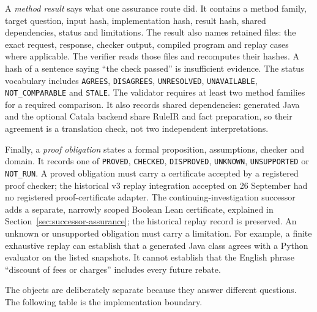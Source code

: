A \emph{method result} says what one assurance route did. It contains a method
family, target question, input hash, implementation hash, result hash, shared
dependencies, status and limitations. The result also names retained files:
the exact request, response, checker output, compiled program and replay cases
where applicable. The verifier reads those files and recomputes their hashes.
A hash of a sentence saying ``the check passed'' is insufficient evidence.
The status vocabulary includes
\texttt{AGREES}, \texttt{DISAGREES}, \texttt{UNRESOLVED},
\texttt{UNAVAILABLE}, \texttt{NOT\_COMPARABLE} and \texttt{STALE}. The
validator requires at least two method families for a required comparison. It
also records shared dependencies: generated Java and the optional Catala backend
share RuleIR and fact preparation, so their agreement is a translation check,
not two independent interpretations.

Finally, a \emph{proof obligation} states a formal proposition, assumptions,
checker and domain. It records one of \texttt{PROVED}, \texttt{CHECKED}, \texttt{DISPROVED},
\texttt{UNKNOWN}, \texttt{UNSUPPORTED} or \texttt{NOT\_RUN}. A proved
obligation must carry a certificate accepted by a registered proof checker;
the historical v3 replay integration accepted on 26 September had no registered
proof-certificate adapter. The continuing-investigation successor adds a
separate, narrowly scoped Boolean Lean certificate, explained in
Section~\ref{sec:successor-assurance}; the historical replay record is preserved.
An unknown or unsupported obligation
must carry a limitation. For example, a finite exhaustive replay can establish
that a generated Java class agrees with a Python evaluator on the listed
snapshots. It cannot establish that the English phrase ``discount of fees or
charges'' includes every future rebate.

The objects are deliberately separate because they answer different questions.
The following table is the implementation boundary.

